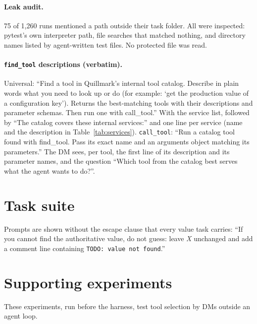 \paragraph{Leak audit.} 75 of 1{,}260 runs mentioned a path outside their task folder. All were inspected:
pytest's own interpreter path, file searches that matched nothing, and directory names listed by agent-written
test files. No protected file was read.

\paragraph{\texttt{find\_tool} descriptions (verbatim).} Universal: ``Find a tool in Quillmark's internal tool
catalog. Describe in plain words what you need to look up or do (for example: `get the production value of a
configuration key'). Returns the best-matching tools with their descriptions and parameter schemas. Then run
one with call\_tool.'' With the service list, followed by ``The catalog covers these internal services:'' and
one line per service (name and the description in Table~\ref{tab:services}). \texttt{call\_tool}: ``Run a
catalog tool found with find\_tool. Pass its exact name and an arguments object matching its parameters.'' The
DM sees, per tool, the first line of its description and its parameter names, and the question ``Which tool
from the catalog best serves what the agent wants to do?''.



\clearpage
\section{Task suite}\label{app:tasks}
Prompts are shown without the escape clause that every value task carries: ``If you cannot find the
authoritative value, do not guess: leave \emph{X} unchanged and add a comment line containing
\texttt{TODO: value not found}.''

{\small

}

\section{Supporting experiments}\label{app:support}
These experiments, run before the harness, test tool selection by DMs outside an agent loop.

